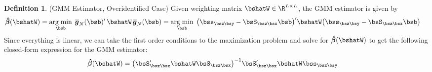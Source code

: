 \documentclass[12pt]{article}
\theoremstyle{plain}
\theoremstyle{definition}
\newtheorem{defn}[thm]{Definition}
\theoremstyle{remark}
\newcommand{\bshatbeta}{\boldsymbol{\hat{\beta}}}
\newcommand{\bsbarg}{\boldsymbol{\overline{g}}}
\DeclareMathOperator*{\argmin}{arg\;min}
\begin{document}
\begin{defn}(GMM Estimator, Overidentified Case)
Given weighting matrix $\bshatW\in \R^{L\times L}$, the GMM estimator is
given by
\begin{align*}
  \bshatbeta(\bshatW)
  &= \argmin_{\bsb} \; \bsbarg_N(\bsb)' \, \bshatW \, \bsbarg_N(\bsb)
  = \argmin_{\bsb} \;
    \big(\bss_{\bsz\bsy} - \bsS_{\bsz\bsx}\bsb\big)'
    \bshatW
    \big(\bss_{\bsz\bsy} - \bsS_{\bsz\bsx}\bsb\big)
\end{align*}
Since everything is linear, we can take the first order conditions to
the maximization problem and solve for $\bshatbeta(\bshatW)$ to get the
following closed-form expression for the GMM estimator:
\begin{align*}
  \bshatbeta(\bshatW) &=
  \big(\bsS_{\bsz\bsx}' \bshatW \bsS_{\bsz\bsx}\big)^{-1}
    \bsS_{\bsz\bsx}' \bshatW \bss_{\bsz\bsy}
\end{align*}
\end{defn}
\end{document}
